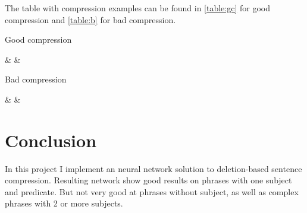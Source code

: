 \documentclass[a4paper,12pt,oneside]{article}
\begin{document}
The table with compression examples can be found in \cref{table:gc} for good compression and \cref{table:b} for bad compression.

\begin{table}
\centering
\caption{Good compression}
\label{table:gc}
%
{\Phrase & \True & \Predicted \\\midrule}%
\end{table}


\begin{table}
\centering
\caption{Bad compression}
\label{table:b}
%
{\Phrase & \True & \Predicted \\\midrule}%
\end{table}


\section {Conclusion}
In this project I implement an neural network solution to deletion-based sentence compression. Resulting network show good results on phrases with one subject and predicate. But not very good at phrases without subject, as well as complex phrases with 2 or more subjects.

 
\end{document}
